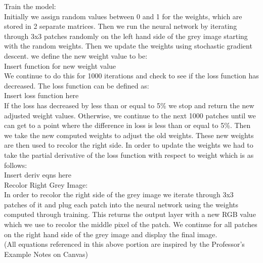 \documentclass{article}
\theoremstyle{definition}
\begin{document}
        Train the model: \\
        Initially we assign random values between 0 and 1 for the weights, which are stored in 2 separate matrices. Then we run the neural network by iterating through 3x3 patches randomly on the left hand side of the grey image starting with the random weights. Then we update the weights using stochastic gradient descent. we define the new weight value to be: \\
        
        Insert function for new weight value \\
        
        We continue to do this for 1000 iterations and check to see if the loss function has decreased. The loss function can be defined as:\\
        
        Insert loss function here \\
        
        If the loss has decreased by less than or equal to 5\% we stop and return the new adjusted weight values. Otherwise, we continue to the next 1000 patches until we can get to a point where the difference in loss is less than or equal to 5\%. Then we take the new computed weights to adjust the old weights. These new weights are then used to recolor the right side. In order to update the weights we had to take the partial derivative of the loss function with respect to weight which is as follows:\\
        
        Insert deriv eqns here\\
        
        Recolor Right Grey Image: \\
        In order to recolor the right side of the grey image we iterate through 3x3 patches of it and plug each patch into the neural network using the weights computed through training. This returns the output layer with a new RGB value which we use to recolor the middle pixel of the patch. We continue for all patches on the right hand side of the grey image and display the final image. \\
        
        (All equations referenced in this above portion are inspired by the Professor's Example Notes on Canvas)
        
    \\\\
    
\end{document}
